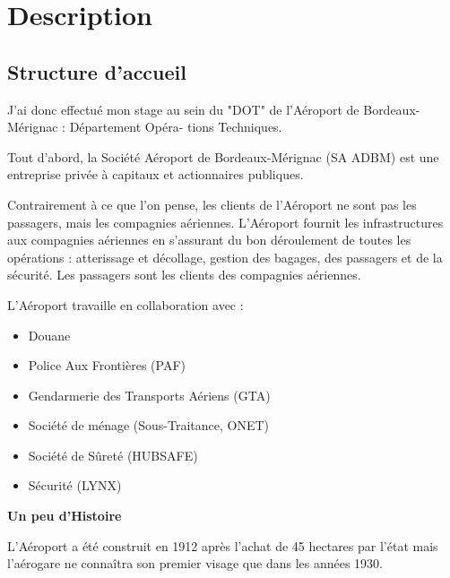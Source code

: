 \chapter{Description}

\section{Structure d'accueil}

J’ai donc effectué mon stage au sein du "DOT" de l’Aéroport de Bordeaux-Mérignac : Département Opéra-
tions Techniques.

Tout d’abord, la Société Aéroport de Bordeaux-Mérignac (SA ADBM) est une entreprise privée à capitaux et actionnaires publiques.

Contrairement à ce que l’on pense, les clients de l’Aéroport ne sont pas les passagers, mais les compagnies
aériennes. L’Aéroport fournit les infrastructures aux compagnies aériennes en s’assurant du bon déroulement
de toutes les opérations : atterissage et décollage, gestion des bagages, des passagers et de la sécurité. Les
passagers sont les clients des compagnies aériennes.\newline

L’Aéroport travaille en collaboration avec :


\begin{itemize}
  \item Douane
  \item Police Aux Frontières (PAF)
  \item Gendarmerie des Transports Aériens (GTA)
  \item Société de ménage (Sous-Traitance, ONET)
  \item Société de Sûreté (HUBSAFE)
  \item Sécurité (LYNX)\newline
\end{itemize}


\textbf{Un peu d'Histoire}\newline

L'Aéroport a été construit en 1912 après l'achat de 45 hectares par l'état mais l'aérogare ne connaîtra son premier visage que dans les années 1930.

